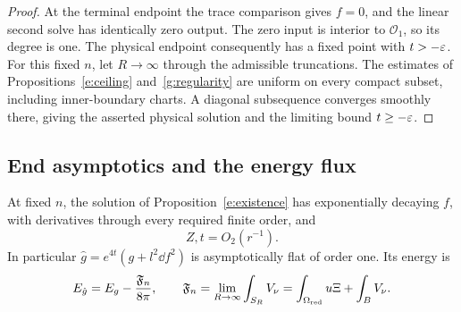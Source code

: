 \begin{proof}
At the terminal endpoint the trace comparison gives $f=0$, and the
linear second solve has identically zero output.  The zero input is
interior to $\mathcal O_1$, so its degree is one.  The physical
endpoint consequently has a fixed point with $t>-\varepsilon$.
For this fixed $n$, let $R\to\infty$ through the admissible
truncations.  The estimates of Propositions~\ref{e:ceiling}
and~\ref{g:regularity} are uniform on every compact subset, including
inner-boundary charts.  A diagonal subsequence converges smoothly
there, giving the asserted physical solution and the limiting bound
$t\ge-\varepsilon$.
\end{proof}

\subsection{End asymptotics and the energy flux}\label{e:flux-section}

\begin{lemma}\label{e:asymptotics}
At fixed $n$, the solution of Proposition~\ref{e:existence} has
exponentially decaying $f$, with derivatives through every required
finite order, and
\[
 Z,t=O_2(r^{-1}).
\]
In particular $\hat g=e^{4t}(g+l^2\dd f^2)$ is asymptotically flat of
order one.  Its energy is
\begin{equation}\label{e:energy-flux}
 E_{\hat g}=E_g-\frac{\mathfrak F_n}{8\pi},\qquad
 \mathfrak F_n=\lim_{R\to\infty}\int_{S_R}V_\nu
       =\int_{\Omega_{\rm red}}u\Xi+\int_BV_\nu.
\end{equation}
\end{lemma}

